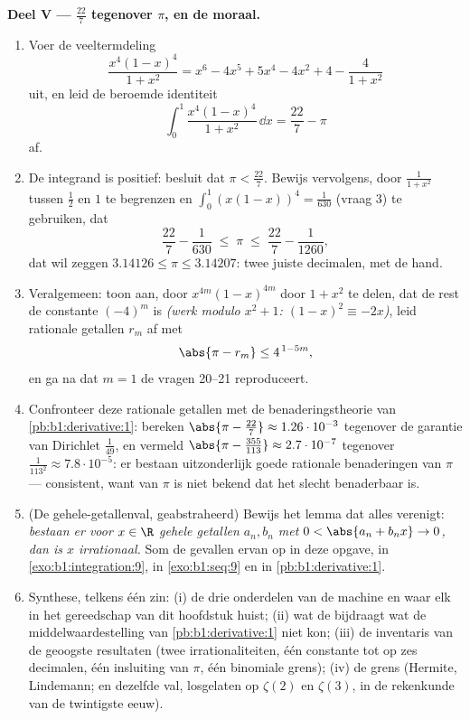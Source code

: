 \begin{problem}
\medskip
\noindent\textbf{Deel V --- $\frac{22}{7}$ tegenover $\pi$, en de
moraal.}
\begin{enumerate}[resume]
  \item Voer de veeltermdeling
        \[
        \frac{x^4(1-x)^4}{1 + x^2}
        = x^6 - 4x^5 + 5x^4 - 4x^2 + 4 - \frac{4}{1 + x^2}
        \]
        uit, en leid de beroemde identiteit
        \[
        \int_0^1 \frac{x^4 (1-x)^4}{1 + x^2}\,\dd x
        = \frac{22}{7} - \pi
        \]
        af.
  \item De integrand is positief: besluit dat $\pi <
        \frac{22}{7}$. Bewijs vervolgens, door $\frac{1}{1+x^2}$
        tussen $\frac12$ en $1$ te begrenzen en $\int_0^1
        (x(1-x))^4 = \frac{1}{630}$ (vraag 3) te gebruiken, dat
        \[
        \frac{22}{7} - \frac{1}{630} \;\leq\; \pi \;\leq\;
        \frac{22}{7} - \frac{1}{1260} ,
        \]
        dat wil zeggen $3.14126 \leq \pi \leq 3.14207$: twee
        juiste decimalen, met de hand.
  \item Veralgemeen: toon aan, door $x^{4m}(1-x)^{4m}$ door $1 +
        x^2$ te delen, dat de rest de constante $(-4)^m$ is
        \emph{(werk modulo $x^2 + 1$: $(1-x)^2 \equiv -2x$)}, leid
        rationale getallen $r_m$ af met
        \[
        \abs{\pi - r_m} \leq 4^{\,1 - 5m} ,
        \]
        en ga na dat $m = 1$ de vragen 20--21 reproduceert.
  \item Confronteer deze rationale getallen met de
        benaderingstheorie van \cref{pb:b1:derivative:1}: bereken
        $\abs{\pi - \frac{22}{7}} \approx 1.26\cdot10^{-3}$
        tegenover de garantie van Dirichlet $\frac{1}{49}$, en
        vermeld $\abs{\pi - \frac{355}{113}} \approx
        2.7\cdot10^{-7}$ tegenover $\frac{1}{113^2} \approx
        7.8\cdot10^{-5}$: er bestaan uitzonderlijk goede rationale
        benaderingen van $\pi$ --- consistent, want van $\pi$ is
        niet bekend dat het slecht benaderbaar is.
  \item (De gehele-getallenval, geabstraheerd) Bewijs het lemma
        dat alles verenigt: \emph{bestaan er voor $x \in \R$ gehele
        getallen $a_n, b_n$ met $0 < \abs{a_n + b_n x} \to 0$, dan
        is $x$ irrationaal.} Som de gevallen ervan op in deze
        opgave, in \cref{exo:b1:integration:9}, in
        \cref{exo:b1:seq:9} en in \cref{pb:b1:derivative:1}.
  \item Synthese, telkens één zin: (i) de drie onderdelen van de
        machine en waar elk in het gereedschap van dit hoofdstuk
        huist; (ii) wat de  bijdraagt wat de
        middelwaardestelling van \cref{pb:b1:derivative:1} niet
        kon; (iii) de inventaris van de geoogste resultaten (twee
        irrationaliteiten, één constante tot op zes decimalen, één
        insluiting van $\pi$, één binomiale grens); (iv) de grens
        (Hermite, Lindemann; en dezelfde val, losgelaten op
        $\zeta(2)$ en $\zeta(3)$, in de rekenkunde van de
        twintigste eeuw).
\end{enumerate}
\end{problem}
